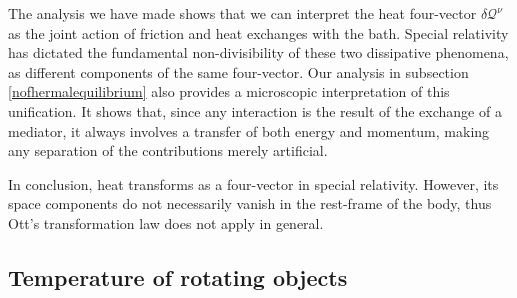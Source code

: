 \documentclass[twocolumn,usenatbib]{mnras2}
\begin{document}
The analysis we have made shows that we can interpret the heat four-vector $\delta \mathcal{Q}^\nu$ as the joint action of friction and heat exchanges with the bath. Special relativity has dictated the fundamental non-divisibility of these two dissipative phenomena, as different components of the same four-vector. Our analysis in subsection \ref{nofhermalequilibrium} also provides a microscopic interpretation of this unification. It shows that, since any interaction is the result of the exchange of a mediator, it always involves a transfer of both energy and momentum, making any separation of the contributions merely artificial.

In conclusion, heat transforms as a four-vector in special relativity. However, its space components do not necessarily vanish in the rest-frame of the body, thus Ott's transformation law does not apply in general.

\subsection{Temperature of rotating objects}
\end{document}
